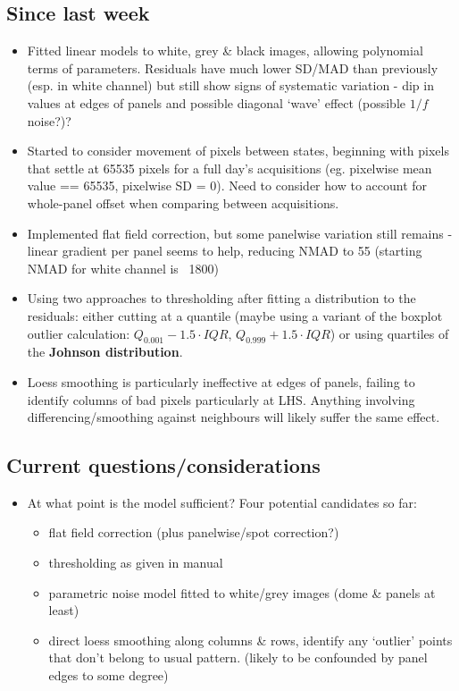 \documentclass[10pt,fleqn]{article}
\begin{document}
\subsection*{Since last week}

\begin{itemize}

\item Fitted linear models to white, grey \& black images, allowing polynomial terms of parameters. Residuals have much lower SD/MAD than previously (esp. in white channel) but still show signs of systematic variation - dip in values at edges of panels and possible diagonal `wave' effect (possible $1/f$ noise?)?
 
\item Started to consider movement of pixels between states, beginning with pixels that settle at 65535 pixels for a full day's acquisitions (eg. pixelwise mean value == 65535, pixelwise SD = 0). Need to consider how to account for whole-panel offset when comparing between acquisitions.

\item Implemented flat field correction, but some panelwise variation still remains - linear gradient per panel seems to help, reducing NMAD to 55 (starting NMAD for white channel is ~1800)

\item Using two approaches to thresholding after fitting a distribution to the residuals: either cutting at a quantile (maybe using a variant of the boxplot outlier calculation: $Q_{0.001} - 1.5 \cdot IQR$, $Q_{0.999} + 1.5 \cdot IQR$) or using quartiles of the \textbf{Johnson distribution}.

\item Loess smoothing is particularly ineffective at edges of panels, failing to identify columns of bad pixels particularly at LHS. Anything involving differencing/smoothing against neighbours will likely suffer the same effect.

\end{itemize}

\subsection*{Current questions/considerations}
\begin{itemize}

\item At what point is the model sufficient? Four potential candidates so far:

\begin{itemize}
\item flat field correction (plus panelwise/spot correction?)
\item thresholding as given in manual
\item parametric noise model fitted to white/grey images (dome \& panels at least)
\item direct loess smoothing along columns \& rows, identify any `outlier' points that don't belong to usual pattern. (likely to be confounded by panel edges to some degree) 
\end{itemize}

\end{itemize}
\end{document}
